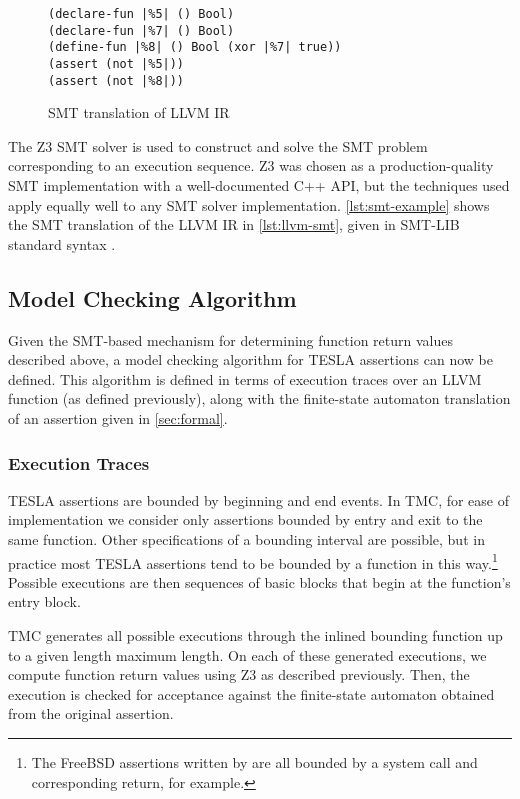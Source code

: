 \begin{figure}
  \begin{verbatim}
(declare-fun |%5| () Bool)
(declare-fun |%7| () Bool)
(define-fun |%8| () Bool (xor |%7| true))
(assert (not |%5|))
(assert (not |%8|))
  \end{verbatim}
  \caption{SMT translation of LLVM IR}
  \label{lst:smt-example}
\end{figure}

The Z3 SMT solver \cite{de_moura_z3:_2008} is used to construct and solve the
SMT problem corresponding to an execution sequence. Z3 was chosen as a
production-quality SMT implementation with a well-documented C++ API, but the
techniques used apply equally well to any SMT solver implementation.
\autoref{lst:smt-example} shows the SMT translation of the LLVM IR in
\autoref{lst:llvm-smt}, given in SMT-LIB standard syntax \cite{BarST-SMT-10}.

\subsection{Model Checking Algorithm} \label{sec:mc}

Given the SMT-based mechanism for determining function return values described
above, a model checking algorithm for TESLA assertions can now be defined. This
algorithm is defined in terms of execution traces over an LLVM function (as
defined previously), along with the finite-state automaton translation of an
assertion given in \autoref{sec:formal}.

\subsubsection{Execution Traces}

TESLA assertions are bounded by beginning and end events. In TMC, for ease of
implementation we consider only assertions bounded by entry and exit to the same
function. Other specifications of a bounding interval are possible, but in
practice most TESLA assertions tend to be bounded by a function in this
way.\footnote{The FreeBSD assertions written by \textcite{anderson_tesla:_2014}
are all bounded by a system call and corresponding return, for example.}
Possible executions are then sequences of basic blocks that begin at the
function's entry block.

TMC generates all possible executions through the inlined bounding function up
to a given length maximum length. On each of these generated executions, we
compute function return values using Z3 as described previously. Then, the
execution is checked for acceptance against the finite-state automaton obtained
from the original assertion.

